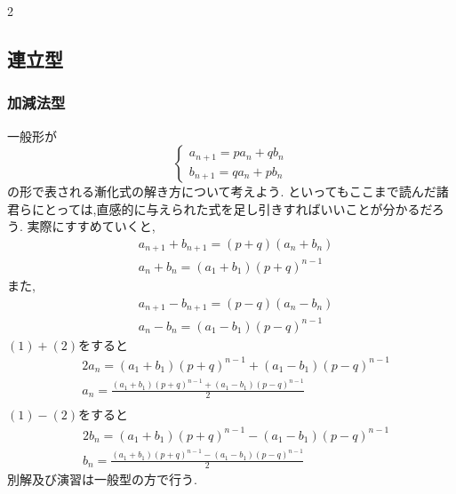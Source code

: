 \documentclass[dvipdfmx,a4paper,11pt,fleqn,openany]{jsbook}
\begin{document}
\begin{multicols*}{2}
  \subsection{連立型}
    \subsubsection{加減法型}
      一般形が
      \[
        \begin{cases}
          a_{n+1}=pa_{n}+qb_{n} \\
          b_{n+1}=qa_{n}+pb_{n}
        \end{cases}
      \]
      の形で表される漸化式の解き方について考えよう.
      といってもここまで読んだ諸君らにとっては,直感的に与えられた式を足し引きすればいいことが分かるだろう.
      実際にすすめていくと,
      \begin{align*}
        &a_{n+1}+b_{n+1}=(p+q)(a_{n}+b_{n})\\
        &a_n+b_n=(a_1+b_1)(p+q)^{n-1}\tag*{\(\cdots\) (1)}
      \end{align*}
      また,
      \begin{align*}
        &a_{n+1}-b_{n+1}=(p-q)(a_{n}-b_{n})\\
        &a_n-b_n=(a_1-b_1)(p-q)^{n-1}\tag*{\(\cdots\) (2)}
      \end{align*}
      $(1)+(2)$をすると
      \begin{align*}
        &2a_n=(a_1+b_1)(p+q)^{n-1}+(a_1-b_1)(p-q)^{n-1}\\
        &a_n=\frac{(a_1+b_1)(p+q)^{n-1}+(a_1-b_1)(p-q)^{n-1}}{2}\\
      \end{align*}
      $(1)-(2)$をすると
      \begin{align*}
        &2b_n=(a_1+b_1)(p+q)^{n-1}-(a_1-b_1)(p-q)^{n-1}\\
        &b_n=\frac{(a_1+b_1)(p+q)^{n-1}-(a_1-b_1)(p-q)^{n-1}}{2}
      \end{align*}
      別解及び演習は一般型の方で行う.

\end{multicols*}
\end{document}

